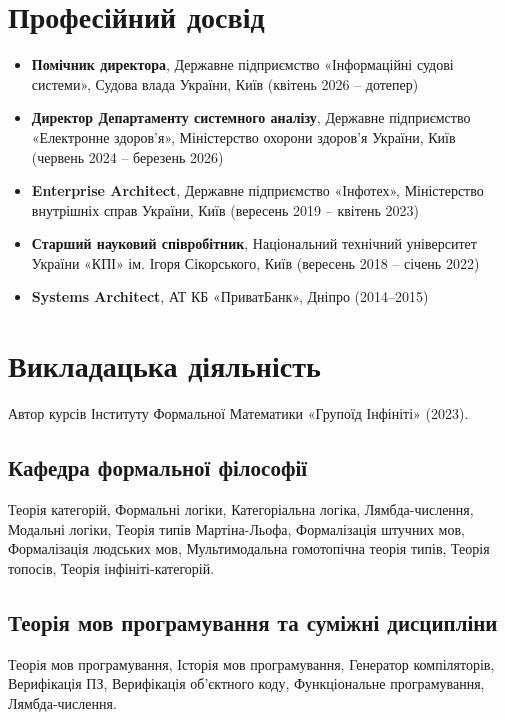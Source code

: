 \documentclass{article}
\begin{document}
\section{Професійний досвід}
\begin{itemize}[leftmargin=*]
    \item \textbf{Помічник директора}, Державне підприємство «Інформаційні судові системи», Судова влада України, Київ (квітень 2026 -- дотепер)
    \item \textbf{Директор Департаменту системного аналізу}, Державне підприємство «Електронне здоров'я», Міністерство охорони здоров'я України, Київ (червень 2024 -- березень 2026)
    \item \textbf{Enterprise Architect}, Державне підприємство «Інфотех», Міністерство внутрішніх справ України, Київ (вересень 2019 -- квітень 2023)
    \item \textbf{Старший науковий співробітник}, Національний технічний університет України «КПІ» ім. Ігоря Сікорського, Київ (вересень 2018 -- січень 2022)
    \item \textbf{Systems Architect}, АТ КБ «ПриватБанк», Дніпро (2014--2015)
\end{itemize}

\section{Викладацька діяльність}
Автор курсів Інституту Формальної Математики «Групоїд Інфініті» (2023).

\subsection{Кафедра формальної філософії}
Теорія категорій, Формальні логіки, Категоріальна логіка, Лямбда-числення, Модальні логіки, Теорія типів Мартіна-Льофа, Формалізація штучних мов, Формалізація людських мов, Мультимодальна гомотопічна теорія типів, Теорія топосів, Теорія інфініті-категорій.

\subsection{Теорія мов програмування та суміжні дисципліни}
Теорія мов програмування, Історія мов програмування, Генератор компіляторів, Верифікація ПЗ, Верифікація об'єктного коду, Функціональне програмування, Лямбда-числення.
\end{document}
